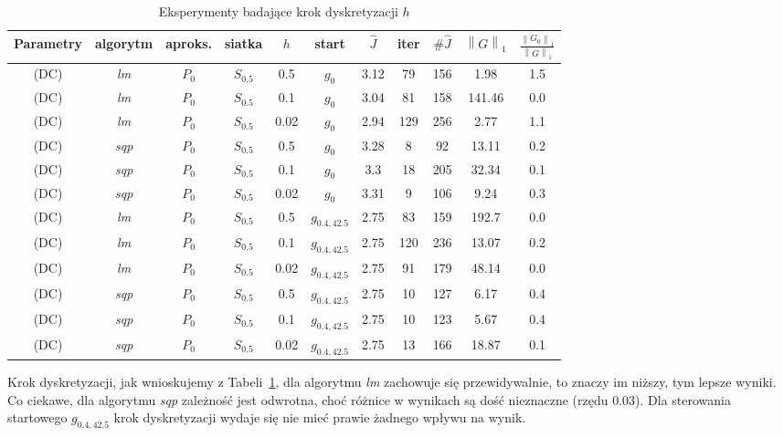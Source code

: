 \documentclass[11pt]{article}
\newcommand{\norm}[1]{\left\lVert#1\right\rVert}
\begin{document}
\begin{table}[h]
  \begin{center}
    \begin{tabular}{|c|c|c|c|c|c|c|c|c|c|c|}
      \hline
      Parametry & algorytm & aproks. & siatka & $h$ & start & $\hat{J}$ & iter & $\#\hat{J}$ & $\norm{G}_1$ & $\frac{\norm{G_0}_1}{\norm{G}_1}$ \\
      \hline
      (DC) & {\it lm\/} & $P_0$ & $S_{0.5}$ & 0.5 & $g_0$ & 3.12 & 79 & 156 & 1.98 & 1.5 \\
      \hline
      (DC) & {\it lm\/} & $P_0$ & $S_{0.5}$ & 0.1 & $g_0$ & 3.04 & 81 & 158 & 141.46 & 0.0 \\
      \hline
      (DC) & {\it lm\/} & $P_0$ & $S_{0.5}$ & 0.02 & $g_0$ & 2.94 & 129 & 256 & 2.77 & 1.1 \\
      \hline
      (DC) & {\it sqp\/} & $P_0$ & $S_{0.5}$ & 0.5 & $g_0$ & 3.28 & 8 & 92 & 13.11 & 0.2 \\
      \hline
      (DC) & {\it sqp\/} & $P_0$ & $S_{0.5}$ & 0.1 & $g_0$ & 3.3 & 18 & 205 & 32.34 & 0.1 \\
      \hline
      (DC) & {\it sqp\/} & $P_0$ & $S_{0.5}$ & 0.02 & $g_0$ & 3.31 & 9 & 106 & 9.24 & 0.3 \\
      \hline
      (DC) & {\it lm\/} & $P_0$ & $S_{0.5}$ & 0.5 & $g_{0.4,42.5}$ & 2.75 & 83 & 159 & 192.7 & 0.0 \\
      \hline
      (DC) & {\it lm\/} & $P_0$ & $S_{0.5}$ & 0.1 & $g_{0.4,42.5}$ & 2.75 & 120 & 236 & 13.07 & 0.2 \\
      \hline
      (DC) & {\it lm\/} & $P_0$ & $S_{0.5}$ & 0.02 & $g_{0.4,42.5}$ & 2.75 & 91 & 179 & 48.14 & 0.0 \\
      \hline
      (DC) & {\it sqp\/} & $P_0$ & $S_{0.5}$ & 0.5 & $g_{0.4,42.5}$ & 2.75 & 10 & 127 & 6.17 & 0.4 \\
      \hline
      (DC) & {\it sqp\/} & $P_0$ & $S_{0.5}$ & 0.1 & $g_{0.4,42.5}$ & 2.75 & 10 & 123 & 5.67 & 0.4 \\
      \hline
      (DC) & {\it sqp\/} & $P_0$ & $S_{0.5}$ & 0.02 & $g_{0.4,42.5}$ & 2.75 & 13 & 166 & 18.87 & 0.1 \\
      \hline
    \end{tabular}
    \caption{Eksperymenty badające krok dyskretyzacji $h$}\label{step_tbl}
  \end{center}
\end{table}

Krok dyskretyzacji, jak wnioskujemy z Tabeli~\ref{step_tbl}, dla algorytmu {\it lm\/} zachowuje się przewidywalnie, to znaczy im niższy, tym lepsze wyniki. Co ciekawe, dla algorytmu {\it sqp\/} zależność jest odwrotna, choć różnice w wynikach są dość nieznaczne (rzędu $0.03$). Dla sterowania startowego $g_{0.4,42.5}$ krok dyskretyzacji wydaje się nie mieć prawie żadnego wpływu na wynik.
\end{document}
